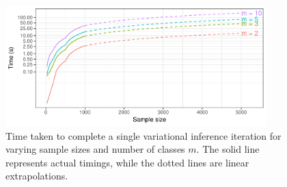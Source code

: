 \documentclass[a4paper,showframe,11pt]{report}
\begin{document}
\begin{figure}[hbt]
  \centering
  \includegraphics[width=0.9\textwidth]{figure/05-iprobit_runtime}
  \caption[Time taken to complete a single variational inference iteration]{Time taken to complete a single variational inference iteration for varying sample sizes and number of classes $m$. The solid line represents actual timings, while the dotted lines are linear extrapolations.}
\end{figure}
\end{document}
